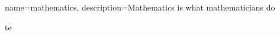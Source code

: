 
{
    name=mathematics,
    description={Mathematics is what mathematicians do}
}

\printglossary[title=Special Terms, toctitle=List of terms]
te